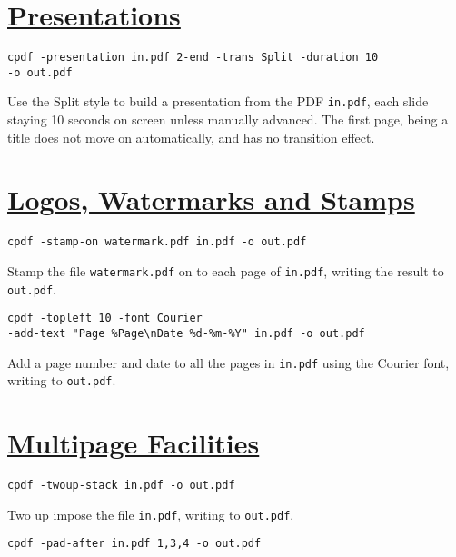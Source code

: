 \documentclass{book}
\begin{document}
\section*{\hyperref[chap:7]{Presentations}}

\begin{framed}\noindent\texttt{cpdf -presentation in.pdf 2-end -trans Split -duration 10\\\phantom{\ \ \ \ } -o out.pdf}\end{framed}

\noindent Use the Split style to build a presentation from the PDF \texttt{in.pdf}, each slide staying 10 seconds on screen unless manually advanced. The first page, being a title does not move on automatically, and has no transition effect.

\section*{\hyperref[chap:8]{Logos, Watermarks and Stamps}}

\begin{framed}\noindent\texttt{cpdf -stamp-on watermark.pdf in.pdf -o out.pdf}\end{framed}

\noindent Stamp the file \texttt{watermark.pdf} on to each page of \texttt{in.pdf}, writing the result to \texttt{out.pdf}.

\begin{framed}\noindent\texttt{cpdf -topleft 10 -font Courier\\ \phantom{\ \ \ \ } -add-text "Page \%Page\textbackslash nDate \%d-\%m-\%Y" in.pdf -o out.pdf}\end{framed}

\noindent Add a page number and date to all the pages in \texttt{in.pdf} using the Courier font, writing to \texttt{out.pdf}.

\section*{\hyperref[chap:9]{Multipage Facilities}}

\begin{framed}\noindent\texttt{cpdf -twoup-stack in.pdf -o out.pdf}\end{framed}

\noindent Two up impose the file \texttt{in.pdf}, writing to \texttt{out.pdf}.

\begin{framed}\noindent\texttt{cpdf -pad-after in.pdf 1,3,4 -o out.pdf}\end{framed}
\end{document}
